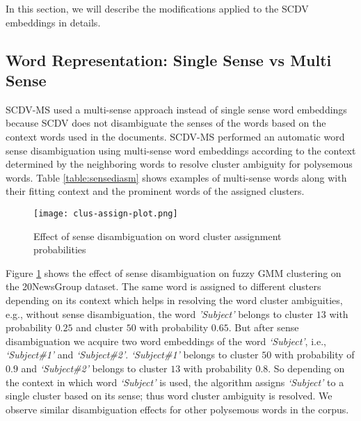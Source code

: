 \documentclass{ecai}
\newcommand{\method}{SCDV-MS}
\begin{document}
In this section, we will describe the modifications applied to the SCDV embeddings in details.
\subsection{Word Representation: Single Sense vs Multi Sense}
\label{subsec:multisense}

\method{} used a multi-sense approach instead of single sense word embeddings because SCDV does not disambiguate the senses of the words based on the context words used in the documents. \method{} performed an automatic word sense disambiguation using multi-sense word embeddings according to the context determined by the neighboring words to resolve cluster ambiguity for polysemous words. Table \ref{table:sensediasm} shows examples of multi-sense words along with their fitting context and the prominent words of the assigned clusters. 

\begin{figure}[!htbp]
\centering
\texttt{[image: clus-assign-plot.png]}
\vspace{-0.5em}
\caption{Effect of sense disambiguation on word cluster assignment probabilities}
\label{figure:sence-disamiguation}
\vspace{-1.5em}
\end{figure}

Figure \ref{figure:sence-disamiguation} shows the effect of sense disambiguation on fuzzy GMM clustering on the 20NewsGroup dataset. The same word is assigned to different clusters depending on its context which helps in resolving the word cluster ambiguities, e.g., without sense disambiguation, the word \textit{'Subject'} belongs to cluster $13$ with probability $0.25$ and cluster $50$ with probability $0.65$. But after sense disambiguation we acquire two word embeddings of the word \textit{`Subject'}, i.e., \textit{`Subject\#1'} and \textit{`Subject\#2'}. \textit{`Subject\#1'} belongs to cluster $50$ with probability of $0.9$ and \textit{`Subject\#2'} belongs to cluster $13$ with probability $0.8$. So depending on the context in which word \textit{`Subject'} is used, the algorithm assigns \textit{`Subject'} to a single cluster based on its sense; thus word cluster ambiguity is resolved. We observe similar disambiguation effects for other polysemous words in the corpus.
\end{document}
